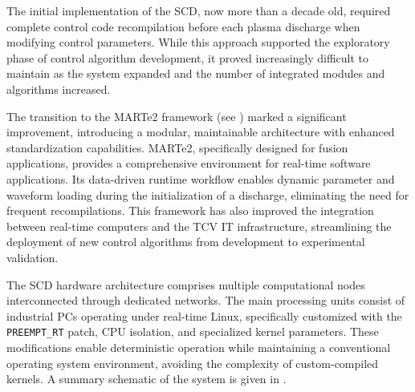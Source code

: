 The initial implementation of the SCD, now more than a decade old, required complete control code recompilation before each plasma discharge when modifying control parameters. While this approach supported the exploratory phase of control algorithm development, it proved increasingly difficult to maintain as the system expanded and the number of integrated modules and algorithms increased.

The transition to the MARTe2 framework (see ) marked a significant improvement, introducing a modular, maintainable architecture with enhanced standardization capabilities. MARTe2, specifically designed for fusion applications, provides a comprehensive environment for real-time software applications. Its data-driven runtime workflow enables dynamic parameter and waveform loading during the initialization of a discharge, eliminating the need for frequent recompilations. This framework has also improved the integration between real-time computers and the TCV IT infrastructure, streamlining the deployment of new control algorithms from development to experimental validation.

The SCD hardware architecture comprises multiple computational nodes interconnected through dedicated networks. The main processing units consist of industrial PCs operating under real-time Linux, specifically customized with the \texttt{PREEMPT\_RT} patch, CPU isolation, and specialized kernel parameters. These modifications enable deterministic operation while maintaining a conventional operating system environment, avoiding the complexity of custom-compiled kernels. A summary schematic of the system is given in .

